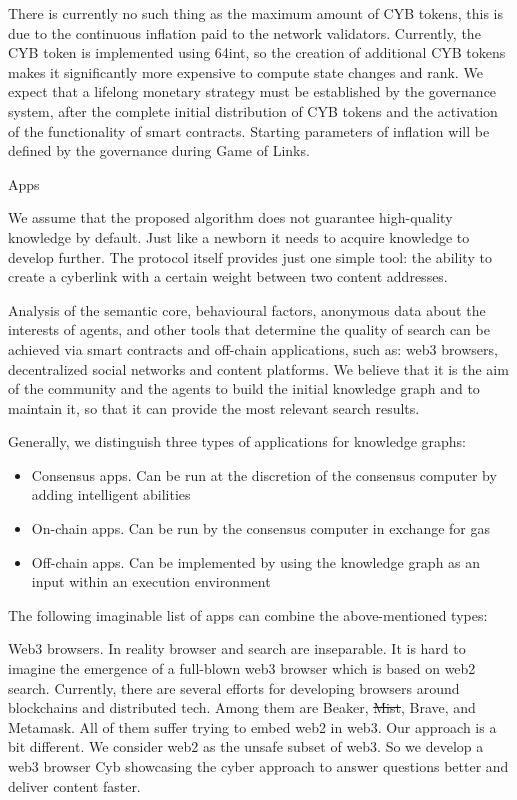 \documentclass[8pt,oneside]{amsart}
\makeatletter
\renewcommand\subsection{\@startsection{subsection}
                                    {2}{\z@}
                                    {-3.25ex\@plus -1ex \@minus -.2ex}
                                    {0ex \@plus .2ex}
                                    {\play\Large}
                        }
\newcommand{\titleSection}[1]{\subsection{#1}}
\newcommand{\code}[1]{{\PlayBold #1}}
\makeatother
\begin{document}
There is currently no such thing as the maximum amount of CYB tokens, this is due to the continuous inflation paid to the network validators. Currently, the CYB token is implemented using 64int, so the creation of additional CYB tokens makes it significantly more expensive to compute state changes and rank. We expect that a lifelong monetary strategy must be established by the governance system, after the complete initial distribution of CYB tokens and the activation of the functionality of smart contracts. Starting parameters of inflation will be defined by the governance during Game of Links.

\titleSection{Apps}\label{Apps}

We assume that the proposed algorithm does not guarantee high-quality knowledge by default. Just like a newborn it needs to acquire knowledge to develop further. The protocol itself provides just one simple tool: the ability to create a cyberlink with a certain weight between two content addresses.

Analysis of the semantic core, behavioural factors, anonymous data about the interests of agents, and other tools that determine the quality of search can be achieved via smart contracts and off-chain applications, such as: web3 browsers, decentralized social networks and content platforms. We believe that it is the aim of the community and the agents to build the initial knowledge graph and to maintain it, so that it can provide the most relevant search results.

Generally, we distinguish three types of applications for knowledge graphs:

\begin{itemize}
\item Consensus apps. Can be run at the discretion of the consensus computer by adding intelligent abilities
\item On-chain apps. Can be run by the consensus computer in exchange for gas
\item Off-chain apps. Can be implemented by using the knowledge graph as an input within an execution environment
\end{itemize}

The following imaginable list of apps can combine the above-mentioned types:

\code{Web3 browsers}. In reality browser and search are inseparable. It is hard to imagine the emergence of a full-blown web3 browser which is based on web2 search. Currently, there are several efforts for developing browsers around blockchains and distributed tech. Among them are Beaker, \sout{Mist}, Brave, and Metamask. All of them suffer trying to embed web2 in web3. Our approach is a bit different. We consider web2 as the unsafe subset of web3. So we develop a web3 browser Cyb showcasing the cyber approach to answer questions better and deliver content faster.
\end{document}
